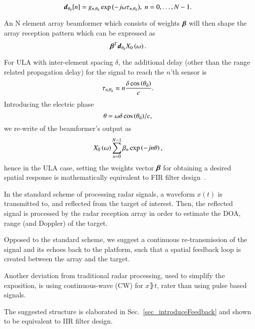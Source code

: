 \begin{equation}
    \label{eq:d}
    \vd_{\thetaD}[n] = g_{n,\thetaD}\exp{\rBrace{-j\omega\tau_{n,\thetaD}}},\;n=0,\ldots,N-1.
\end{equation}
\par An N element array beamformer which consists of weights $\boldsymbol{\beta}$ will then shape the array reception pattern which can be expressed as 
$$ \vBetaT\vd_{\thetaD}\F{x}_{0}\rBrace{\omega}. $$ 
\par For ULA with inter-element spacing $\delta$, the additional delay (other than the range related propagation delay) for the signal to reach the $n$'th sensor is
$$
\tau_{n,\theta_{\text{d}}}=n\frac{\delta\cos\left({\theta_{\text{d}}}\right)}{c}.
$$
Introducing the electric phase
\begin{equation}\label{eq:thetaULA}
\theta=\omega{\delta\cos\Brack{\thetaD}}/{c},
\end{equation}
we re-write of the beamformer's output as 
\[
\F{x}_0\rBrace{\omega}\sum_{n=0}^{N-1}\beta_n
\exp\Brack{-jn\theta},
\]
hence in the ULA case, setting the weights vector $\boldsymbol{\beta}$ for obtaining a desired spatial response is mathematically equivalent to FIR filter design~\cite{VanVeenBeamforming:Filtering}.
\par In the standard scheme of processing radar signals, a waveform $x(t)$ is transmitted to, and reflected from the target of interest. Then, the reflected signal is processed by the radar reception array in order to estimate the DOA, range (and Doppler) of the target. 
\par Opposed to the standard scheme, we suggest a continuous re-transmission of the signal and its echoes back to the platform, such that a spatial feedback loop is created between the array and the target.
\par Another deviation from traditional radar processing, used to simplify the exposition, is using continuous-wave (CW) for $x\rBrace{t}$, rater than using pulse based signals. 
\par The suggested structure is elaborated in Sec.~\ref{sec_introduceFeedback} and shown to be equivalent to IIR filter design.